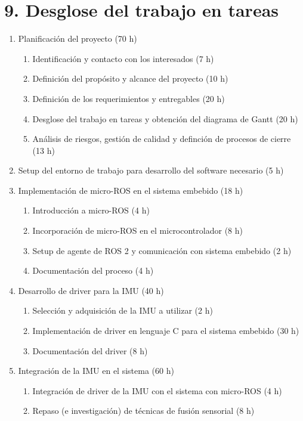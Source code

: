 \documentclass[
11pt, %
codirector, %
]{charter}
\begin{document}
\section{9. Desglose del trabajo en tareas}
\label{sec:wbs}

\begin{enumerate}
	\item Planificación del proyecto (70 h)
	\begin{enumerate}
		\item Identificación y contacto con los interesados (7 h)
		\item Definición del propósito y alcance del proyecto (10 h)
		\item Definición de los requerimientos y entregables (20 h)
		\item Desglose del trabajo en tareas y obtención del diagrama de Gantt (20 h)
		\item Análisis de riesgos, gestión de calidad y definción de procesos de cierre (13 h)
	\end{enumerate}
	\item Setup del entorno de trabajo para desarrollo del software necesario (5 h)
	\item Implementación de micro-ROS en el sistema embebido (18 h)
	\begin{enumerate}
		\item Introducción a micro-ROS (4 h)
		\item Incorporación de micro-ROS en el microcontrolador (8 h)
		\item Setup de agente de ROS 2 y comunicación con sistema embebido (2 h)
		\item Documentación del proceso (4 h)
	\end{enumerate}
	\item Desarrollo de driver para la IMU (40 h)
	\begin{enumerate}
		\item Selección y adquisición de la IMU a utilizar (2 h)
		\item Implementación de driver en lenguaje C para el sistema embebido (30 h)
		\item Documentación del driver (8 h)
	\end{enumerate}
	\item Integración de la IMU en el sistema (60 h)
	\begin{enumerate}
		\item Integración de driver de la IMU con el sistema con micro-ROS (4 h)
		\item Repaso (e investigación) de técnicas de fusión sensorial (8 h)

\end{enumerate}
\end{enumerate}
\end{document}

